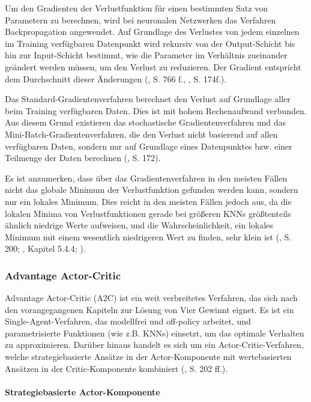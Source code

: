 Um den Gradienten der Verlustfunktion für einen bestimmten Satz von Parametern zu berechnen, wird bei neuronalen Netzwerken das Verfahren Backpropagation angewendet. Auf Grundlage des Verlustes von jedem einzelnen im Training verfügbaren Datenpunkt wird rekursiv von der Output-Schicht bis hin zur Input-Schicht bestimmt, wie die Parameter im Verhältnis zueinander geändert werden müssen, um den Verlust zu reduzieren. Der Gradient entspricht dem Durchschnitt dieser Änderungen (\cite{Russell.2020}, S. 766 f., \cite{Albrecht.2024}, S. 174f.).

Das Standard-Gradientenverfahren berechnet den Verlust auf Grundlage aller beim Training verfügbaren Daten. Dies ist mit hohem Rechenaufwand verbunden. Aus diesem Grund existieren das stochastische Gradientenverfahren und das Mini-Batch-Gradienten\-verfahren, die den Verlust nicht basierend auf allen verfügbaren Daten, sondern nur auf Grundlage eines Datenpunktes bzw. einer Teilmenge der Daten berechnen (\cite{Albrecht.2024}, S. 172).

Es ist anzumerken, dass über das Gradientenverfahren in den meisten Fällen nicht das globale Minimum der Verlustfunktion gefunden werden kann, sondern nur ein lokales Minimum. Dies reicht in den meisten Fällen jedoch aus, da die lokalen Minima von Verlustfunktionen gerade bei größeren KNNs größtenteils ähnlich niedrige Werte aufweisen, und die Wahrscheinlichkeit, ein lokales Minimum mit einem wesentlich niedrigeren Wert zu finden, sehr klein ist (\cite{Sutton.2018}, S. 200; \cite{Ferguson.January2019}, Kapitel 5.4.4; \cite{Choromanska.2015}).

\subsubsection{Advantage Actor-Critic}

\label{a2c}

Advantage Actor-Critic (A2C) ist ein weit verbreitetes Verfahren, das sich nach den vorangegangenen Kapiteln zur Lösung von Vier Gewinnt eignet. Es ist ein Single-Agent-Verfahren, das modellfrei und off-policy arbeitet, und parametrisierte Funktionen (wie z.B. KNNs) einsetzt, um das optimale Verhalten zu approximieren. Darüber hinaus handelt es sich um ein Actor-Critic-Verfahren, welche strategiebasierte Ansätze in der Actor-Komponente mit wertebasierten Ansätzen in der Critic-Komponente kombiniert (\cite{Albrecht.2024}, S. 202 ff.).

\paragraph{Strategiebasierte Actor-Komponente}

